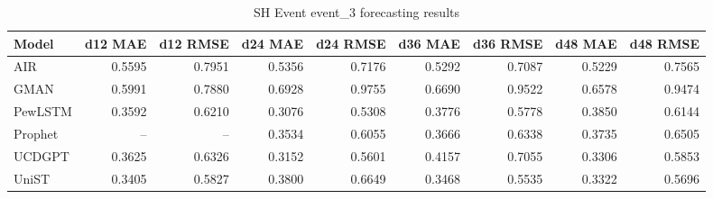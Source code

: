 \begin{table}[htbp]
\centering
\small
\caption{SH Event event\_3 forecasting results}
\label{tab:sh-event-event-3}
\begin{tabular}{lrrrrrrrr}
\toprule
Model & d12 MAE & d12 RMSE & d24 MAE & d24 RMSE & d36 MAE & d36 RMSE & d48 MAE & d48 RMSE \\
\midrule
AIR & 0.5595 & 0.7951 & 0.5356 & 0.7176 & 0.5292 & 0.7087 & 0.5229 & 0.7565 \\
GMAN & 0.5991 & 0.7880 & 0.6928 & 0.9755 & 0.6690 & 0.9522 & 0.6578 & 0.9474 \\
PewLSTM & 0.3592 & 0.6210 & 0.3076 & 0.5308 & 0.3776 & 0.5778 & 0.3850 & 0.6144 \\
Prophet & -- & -- & 0.3534 & 0.6055 & 0.3666 & 0.6338 & 0.3735 & 0.6505 \\
UCDGPT & 0.3625 & 0.6326 & 0.3152 & 0.5601 & 0.4157 & 0.7055 & 0.3306 & 0.5853 \\
UniST & 0.3405 & 0.5827 & 0.3800 & 0.6649 & 0.3468 & 0.5535 & 0.3322 & 0.5696 \\
\bottomrule
\end{tabular}
\end{table}
